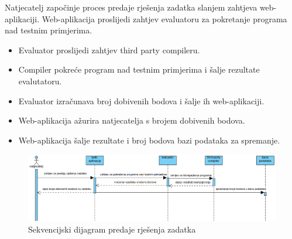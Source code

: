\documentclass{article}
\begin{document}
Natjecatelj započinje proces predaje rješenja zadatka slanjem zahtjeva web-aplikaciji.
Web-aplikacija proslijedi zahtjev evaluatoru za pokretanje programa nad testnim primjerima.

\begin{itemize}
  \item Evaluator proslijedi zahtjev third party compileru. 
  \item Compiler pokreće program nad testnim primjerima  i šalje rezultate evalutatoru.
  \item Evaluator izračunava broj dobivenih bodova i šalje ih web-aplikaciji.
  \item Web-aplikacija ažurira natjecatelja s brojem dobivenih bodova.
  \item Web-aplikacija šalje rezultate i broj bodova bazi podataka za spremanje.
\end{itemize}


\begin{figure}[h!]
  \centering
  \includegraphics[width=\textwidth]{../slike/predaja_rjesenja_zadatka.png}
  \caption{Sekvencijski dijagram predaje rješenja zadatka}\label{fig:solution_submission_diag}
\end{figure}
\end{document}
